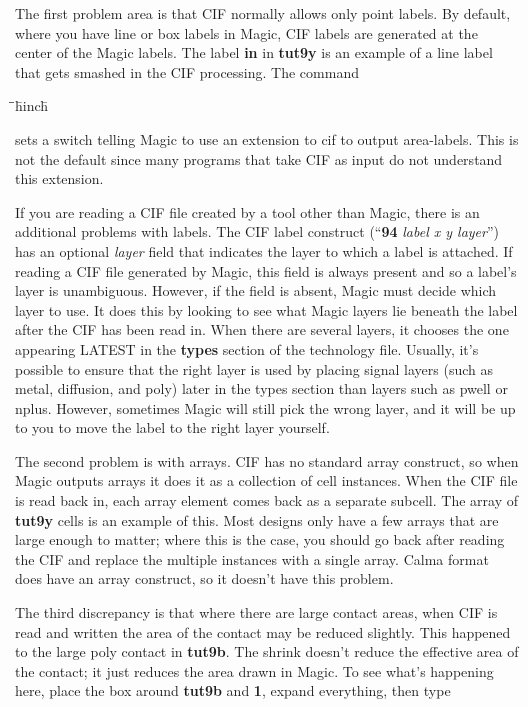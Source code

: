 \documentclass[letterpaper,twoside,12pt]{article}
\def\hinch{\hspace*{0.5in}}
\def\starti{\begin{center}\begin{tabbing}\hinch\=\hinch\=\hinch\=hinch\hinch\=\kill}
\def\endi{\end{tabbing}\end{center}}
\def\ii{\>\>\>}
\begin{document}
The first problem area is that CIF normally allows only point labels.  By
default, where you have line or box labels in Magic,
CIF labels are generated at the center of the Magic labels.
The label {\bfseries in} in {\bfseries tut9y} is an example of a line label
that gets smashed in the CIF processing.  The command

\starti
   \ii {\bfseries :cif arealabels yes}
\endi

sets a switch telling Magic to use an extension to cif to output 
area-labels.  This is not the default since many programs that
take CIF as input do not understand this extension.

If you are reading a CIF file created by a tool other than Magic,
there is an additional problems with labels.  The CIF label construct
(``{\bfseries 94} {\itshape label x y layer}'') has an optional {\itshape layer} field
that indicates the layer to which a label is attached.  If reading
a CIF file generated by Magic, this field is always present and so
a label's layer is unambiguous.  However, if the field is absent,
Magic must decide which layer to use.  It does this by looking to
see what Magic layers lie beneath the label after the CIF has been
read in.  When there are several layers, it chooses the one appearing
LATEST in the {\bfseries types} section of the technology file.  Usually,
it's possible to ensure that the right layer is used by placing
signal layers (such as metal, diffusion, and poly) later in the
types section than layers such as pwell or nplus.  However, sometimes
Magic will still pick the wrong layer, and it will be up to you to
move the label to the right layer yourself.

The second problem is with arrays.  CIF has no standard array
construct, so when Magic outputs arrays it does it as a collection
of cell instances.  When the CIF file is read back in, each array
element comes back as a separate subcell.
The array of {\bfseries tut9y} cells is an example of this.
Most designs only have
a few arrays that are large enough to matter;  where this is the
case, you should go back after reading the CIF and replace the
multiple instances with a single array.
Calma format does have an array construct, so it
doesn't have this problem.

The third discrepancy is that where there are large contact areas,
when CIF is read and written the area of the contact may be
reduced slightly.  This happened to the large poly contact in
{\bfseries tut9b}.  The shrink doesn't reduce the effective area of
the contact;  it just reduces the area drawn in Magic.
To see what's happening here, place
the box around {\bfseries tut9b} and {\bfseries 1}, expand everything,
then type
\end{document}

